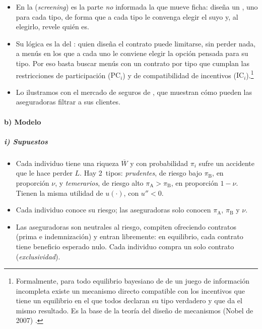 \documentclass[11pt]{article}
\begin{document}
\begin{itemize}
\item En la  (\emph{screening}) es la parte \emph{no} informada la que mueve ficha: diseña un , uno para cada tipo, de forma que a cada tipo le convenga elegir el suyo y, al elegirlo, revele quién es.
\item Su lógica es la del : quien diseña el contrato puede limitarse, sin perder nada, a menús en los que a cada uno le conviene elegir la opción pensada para su tipo\nocite{Gibbard1973Manipulation,DasguptaHammondMaskin1979Implementation,Myerson1979Incentive}. Por eso basta buscar menús con un contrato por tipo que cumplan las restricciones de participación ($\mathrm{PC}_i$) y de compatibilidad de incentivos ($\mathrm{IC}_i$).\footnote{Formalmente, para todo equilibrio bayesiano de  de un juego de información incompleta existe un mecanismo directo compatible con los incentivos que tiene un equilibrio en el que todos declaran su tipo verdadero y que da el mismo resultado. Es la base de la teoría del diseño de mecanismos (Nobel de 2007)  .}
\item Lo ilustramos con el mercado de seguros de \textcite{RothschildStiglitz1976Equilibrium}, que muestran cómo pueden las aseguradoras filtrar a sus clientes.
\end{itemize}

\paragraph{b) Modelo}

\subparagraph{i) Supuestos}

\begin{itemize}
\item Cada individuo tiene una riqueza $\overline{W}$ y con probabilidad $\pi_i$ sufre un accidente que le hace perder $L$. Hay 2~tipos: \emph{prudentes}, de riesgo bajo $\pi_{\mathrm{B}}$, en proporción $\nu$, y \emph{temerarios}, de riesgo alto $\pi_{\mathrm{A}}>\pi_{\mathrm{B}}$, en proporción $1-\nu$. Tienen la misma utilidad de  $u(\cdot)$, con $u''<0$.
\item Cada individuo conoce su riesgo; las aseguradoras solo conocen $\pi_{\mathrm{A}}$, $\pi_{\mathrm{B}}$ y $\nu$.
\item Las aseguradoras son neutrales al riesgo, compiten ofreciendo contratos (prima e indemnización) y entran libremente: en equilibrio, cada contrato tiene beneficio esperado nulo. Cada individuo compra un solo contrato (\emph{exclusividad}).
\end{itemize}
\end{document}
